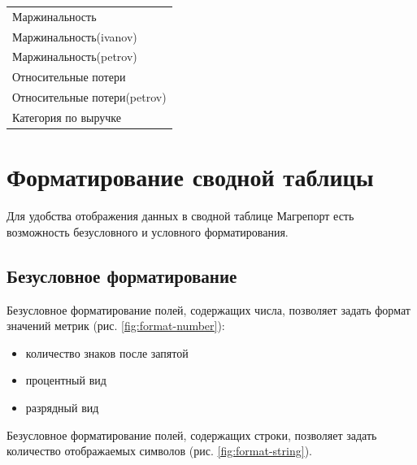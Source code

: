 \documentclass[../user-manual.tex]{subfiles}
\begin{document}
	\begin{tabular}{l}
		
		Маржинальность\\
		
		Маржинальность(ivanov)\\
		
		Маржинальность(petrov)\\
		
		Относительные потери\\
		
		Относительные потери(petrov)\\
		
		Категория по выручке\\
		
	\end{tabular}
	
	
	\section{Форматирование сводной таблицы}
	
	Для удобства отображения данных в сводной таблице Магрепорт есть возможность безусловного и условного форматирования.
	
	\subsection{Безусловное форматирование}
	
	Безусловное форматирование полей, содержащих числа, позволяет задать формат значений метрик (рис. \ref{fig:format-number}):
	\begin{itemize}
		
		\item количество знаков после запятой
		
		\item процентный вид
		
		\item разрядный вид
	\end{itemize}

	Безусловное форматирование полей, содержащих строки, позволяет задать количество отображаемых символов (рис. \ref{fig:format-string}).
	
\end{document}
